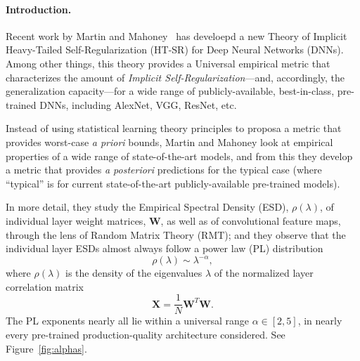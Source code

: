 \vspace{-3mm}
\paragraph{Introduction.}

Recent work by Martin and Mahoney~\cite{MM18_TR,MM19_HTSR_ICML} has develoepd a new Theory of Implicit Heavy-Tailed Self-Regularization (HT-SR) for Deep Neural Networks (DNNs). 
Among other things, this theory provides a Universal empirical metric that characterizes the amount of \emph{Implicit Self-Regularization}---and, accordingly, the generalization capacity---for a wide range of publicly-available, best-in-class, pre-trained DNNs, including AlexNet, VGG, ResNet, etc.   

Instead of using statistical learning theory principles to proposa a metric that provides worst-case \emph{a priori} bounds, Martin and Mahoney look at empirical properties of a wide range of state-of-the-art models, and from this they develop a metric that provides \emph{a posteriori} predictions for the typical case (where ``typical'' is for current state-of-the-art publicly-available pre-trained models).

In more detail, they study the Empirical Spectral Density (ESD), $\rho(\lambda)$, of individual layer weight matrices, $\mathbf{W}$, as well as of convolutional feature maps, through the lens of Random Matrix Theory (RMT); and they observe that the individual layer ESDs almost always follow a power law (PL) distribution
\begin{equation}
\rho(\lambda)\sim\lambda^{-\alpha}  ,
\label{eqn:eigenval_pl}
\end{equation}
where $\rho(\lambda)$ is the density of the eigenvalues $\lambda$ of the normalized layer correlation matrix 
\begin{equation}
 \mathbf{X} = \frac{1}{N}\mathbf{W}^{T}\mathbf{W}.
\end{equation}
The PL exponents nearly all lie within a universal range $\alpha\in[2,5]$, in nearly every pre-trained production-quality architecture considered.
See Figure~\ref{fig:alphas}.

